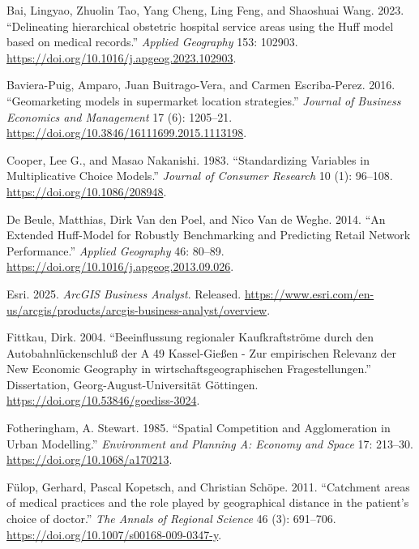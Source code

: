 \documentclass[
]{article}
\newlength{\cslhangindent}
\newenvironment{CSLReferences}[2] %
 {\begin{list}{}{%
  \setlength{\itemindent}{0pt}
  \setlength{\leftmargin}{0pt}
  \setlength{\parsep}{0pt}
  \ifodd #1
   \setlength{\leftmargin}{\cslhangindent}
   \setlength{\itemindent}{-1\cslhangindent}
  \fi
  \setlength{\itemsep}{#2\baselineskip}}}
 {\end{list}}
\begin{document}
\protect{}\label{refs}
\begin{CSLReferences}{1}{1}
Bai, Lingyao, Zhuolin Tao, Yang Cheng, Ling Feng, and Shaoshuai Wang.
2023. {``{Delineating hierarchical obstetric hospital service areas
using the Huff model based on medical records}.''} \emph{Applied
Geography} 153: 102903.
\url{https://doi.org/10.1016/j.apgeog.2023.102903}.

Baviera-Puig, Amparo, Juan Buitrago-Vera, and Carmen Escriba-Perez.
2016. {``{Geomarketing models in supermarket location strategies}.''}
\emph{Journal of Business Economics and Management} 17 (6): 1205--21.
\url{https://doi.org/10.3846/16111699.2015.1113198}.

Cooper, Lee G., and Masao Nakanishi. 1983. {``{Standardizing Variables
in Multiplicative Choice Models}.''} \emph{Journal of Consumer Research}
10 (1): 96--108. \url{https://doi.org/10.1086/208948}.

De Beule, Matthias, Dirk Van den Poel, and Nico Van de Weghe. 2014.
{``An Extended Huff-Model for Robustly Benchmarking and Predicting
Retail Network Performance.''} \emph{Applied Geography} 46: 80--89.
\url{https://doi.org/10.1016/j.apgeog.2013.09.026}.

Esri. 2025. \emph{ArcGIS Business Analyst}. Released.
\url{https://www.esri.com/en-us/arcgis/products/arcgis-business-analyst/overview}.

Fittkau, Dirk. 2004. {``{Beeinflussung regionaler Kaufkraftströme durch
den Autobahnlückenschluß der A 49 Kassel-Gießen - Zur empirischen
Relevanz der New Economic Geography in wirtschaftsgeographischen
Fragestellungen}.''} Dissertation, Georg-August-Universität Göttingen.
\url{https://doi.org/10.53846/goediss-3024}.

Fotheringham, A. Stewart. 1985. {``{Spatial Competition and
Agglomeration in Urban Modelling}.''} \emph{Environment and Planning A:
Economy and Space} 17: 213--30. \url{https://doi.org/10.1068/a170213}.

Fülop, Gerhard, Pascal Kopetsch, and Christian Schöpe. 2011.
{``{Catchment areas of medical practices and the role played by
geographical distance in the patient's choice of doctor}.''} \emph{The
Annals of Regional Science} 46 (3): 691--706.
\url{https://doi.org/10.1007/s00168-009-0347-y}.


\end{CSLReferences}
\end{document}
